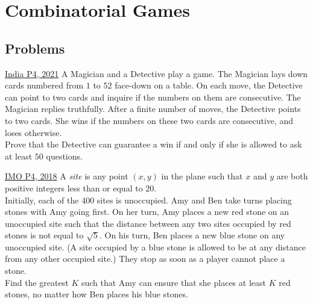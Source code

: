 \section{Combinatorial Games}
\subsection{Problems}
\begin{problem}{1}{\href{https://artofproblemsolving.com/community/q1h2478238p34659801}{India P4, 2021}} 
		A Magician and a Detective play a game. The Magician lays down cards numbered from $1$ to $52$ face-down on a table. On each move, the Detective can point to two cards and inquire if the numbers on them are consecutive. The Magician replies truthfully. After a finite number of moves, the Detective points to two cards. She wins if the numbers on these two cards are consecutive, and loses otherwise.\\
	Prove that the Detective can guarantee a win if and only if she is allowed to ask at least $50$ questions.
\end{problem}


\begin{problem}{2}{\href{https://artofproblemsolving.com/community/c6h1671290p35965430}{IMO P4, 2018}}
		A \emph{site} is any point $(x, y)$ in the plane such that $x$ and $y$ are both positive integers less than or equal to 20.\\
	Initially, each of the 400 sites is unoccupied. Amy and Ben take turns placing stones with Amy going first. On her turn, Amy places a new red stone on an unoccupied site such that the distance between any two sites occupied by red stones is not equal to $\sqrt{5}$. On his turn, Ben places a new blue stone on any unoccupied site. (A site occupied by a blue stone is allowed to be at any distance from any other occupied site.) They stop as soon as a player cannot place a stone.\\
	Find the greatest $K$ such that Amy can ensure that she places at least $K$ red stones, no matter how Ben places his blue stones.
\end{problem}


